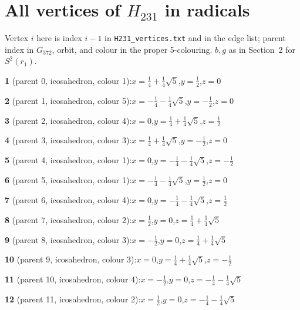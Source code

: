 \documentclass[10pt]{article}
\begin{document}
\appendix
\renewcommand{\thesection}{S\arabic{section}}
\section{All vertices of $H_{231}$ in radicals}\label{app:h231}
Vertex $i$ here is index $i-1$ in \texttt{H231\_vertices.txt} and in the edge list; parent index in
$G_{372}$, orbit, and colour in the proper 5-colouring. $b,g$ as in Section~2 for $S^2(r_1)$.

{\footnotesize\raggedright
\noindent\textbf{1} (parent 0, icosahedron, colour 1):\quad $x=\tfrac{1}{4}+\tfrac{1}{4}\sqrt5$,\quad $y=\tfrac{1}{2}$,\quad $z=0$\par\smallskip
\noindent\textbf{2} (parent 1, icosahedron, colour 5):\quad $x=-\tfrac{1}{4}-\tfrac{1}{4}\sqrt5$,\quad $y=-\tfrac{1}{2}$,\quad $z=0$\par\smallskip
\noindent\textbf{3} (parent 2, icosahedron, colour 4):\quad $x=0$,\quad $y=\tfrac{1}{4}+\tfrac{1}{4}\sqrt5$,\quad $z=\tfrac{1}{2}$\par\smallskip
\noindent\textbf{4} (parent 3, icosahedron, colour 3):\quad $x=\tfrac{1}{4}+\tfrac{1}{4}\sqrt5$,\quad $y=-\tfrac{1}{2}$,\quad $z=0$\par\smallskip
\noindent\textbf{5} (parent 4, icosahedron, colour 1):\quad $x=0$,\quad $y=-\tfrac{1}{4}-\tfrac{1}{4}\sqrt5$,\quad $z=-\tfrac{1}{2}$\par\smallskip
\noindent\textbf{6} (parent 5, icosahedron, colour 1):\quad $x=-\tfrac{1}{4}-\tfrac{1}{4}\sqrt5$,\quad $y=\tfrac{1}{2}$,\quad $z=0$\par\smallskip
\noindent\textbf{7} (parent 6, icosahedron, colour 4):\quad $x=0$,\quad $y=-\tfrac{1}{4}-\tfrac{1}{4}\sqrt5$,\quad $z=\tfrac{1}{2}$\par\smallskip
\noindent\textbf{8} (parent 7, icosahedron, colour 2):\quad $x=\tfrac{1}{2}$,\quad $y=0$,\quad $z=\tfrac{1}{4}+\tfrac{1}{4}\sqrt5$\par\smallskip
\noindent\textbf{9} (parent 8, icosahedron, colour 3):\quad $x=-\tfrac{1}{2}$,\quad $y=0$,\quad $z=\tfrac{1}{4}+\tfrac{1}{4}\sqrt5$\par\smallskip
\noindent\textbf{10} (parent 9, icosahedron, colour 3):\quad $x=0$,\quad $y=\tfrac{1}{4}+\tfrac{1}{4}\sqrt5$,\quad $z=-\tfrac{1}{2}$\par\smallskip
\noindent\textbf{11} (parent 10, icosahedron, colour 4):\quad $x=-\tfrac{1}{2}$,\quad $y=0$,\quad $z=-\tfrac{1}{4}-\tfrac{1}{4}\sqrt5$\par\smallskip
\noindent\textbf{12} (parent 11, icosahedron, colour 2):\quad $x=\tfrac{1}{2}$,\quad $y=0$,\quad $z=-\tfrac{1}{4}-\tfrac{1}{4}\sqrt5$\par\smallskip
}
\end{document}
